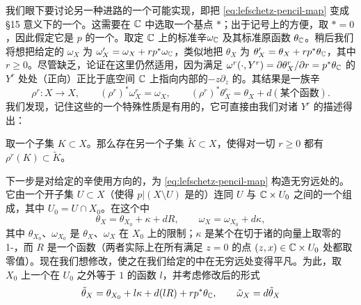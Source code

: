 我们眼下要讨论另一种进路的一个可能实现，即把 \eqref{eq:lefschetz-pencil-map} 变成 §15 意义下的一个\trExact\trLefschetzFibration。这需要在 $\mathbb{C}$ 中选取一个基点 $*$；出于记号上的方便，取 $*=0$，因此假定它是 $p$ 的一个\trRegularValue。取定 $\mathbb{C}$ 上的标准辛\trForm{}$\omega_{\mathbb{C}}$ 及其标准原函数 $\theta_{\mathbb{C}}$。稍后我们将想把给定的 $\omega_X$ \trDeformation{}为 $\omega'_X=\omega_X+rp^*\omega_{\mathbb{C}}$，类似地把 $\theta_X$ \trDeformation{}为 $\theta'_X=\theta_X+rp^*\theta_{\mathbb{C}}$，其中 $r\ge 0$。尽管缺乏\trCompactness，\trMoser{}论证在这里仍然适用，因为满足 $\omega^r(\cdot,Y^r)=\partial\theta^r_X/\partial r=p^*\theta_{\mathbb{C}}$ 的\trVectorField{}$Y^r$ 处处（正向）正比于底空间 $\mathbb{C}$ 上指向内部的\trRadial{}\trVectorField{}$-z\partial_z$ 的\trHorizontal{}\trLift。其结果是一族\trExact{}辛\trEmbedding
\begin{equation*}
\rho^r\colon X\longrightarrow X,\qquad (\rho^r)^*\omega^r_X=\omega_X,\qquad (\rho^r)^*\theta^r_X=\theta_X+d(\text{某个函数}).
\end{equation*}
我们发现，记住这些\trEmbedding{}的一个特殊性质是有用的，它可直接由我们对诸 $Y^r$ 的描述得出：
\begin{lemma}\label{thm:embedding-uniform-boundedness}
取一个\trCompact{}子集 $K\subset X$。那么存在另一个\trCompact{}子集 $\tilde{K}\subset X$，使得对一切 $r\ge 0$ 都有 $\rho^r(K)\subset\tilde{K}$。
\end{lemma}
\noqed
下一步是对给定的辛\trConnection{}使用\trRadial{}方向的\trParallelTransport，为 \eqref{eq:lefschetz-pencil-map} 构造无穷远处的\trTrivialization。它由一个开子集 $U\subset X$（使得 $p|(X\setminus U)$ 是\trProper{}的）连同 $U$ 与 $\mathbb{C}\times U_0$ 之间的一个\trFibrewise{}\trDiffeomorphism{}组成，其中 $U_0=U\cap X_0$。在这个\trTrivialization{}中
\begin{equation*}
\theta_X=\theta_{X_0}+\kappa+dR,\qquad \omega_X=\omega_{X_0}+d\kappa,
\end{equation*}
其中 $\theta_{X_0}$、$\omega_{X_0}$ 是 $\theta_X$、$\omega_X$ 在 $X_0$ 上的限制；$\kappa$ 是某个在切于诸\trFiber{}的向量上取零的 1-\trForm，而 $R$ 是一个函数（两者实际上在所有满足 $z=0$ 的点 $(z,x)\in\mathbb{C}\times U_0$ 处都取零值）。现在我们想修改\trParallelTransport，使之在我们给定的\trTrivialization{}中在无穷远处变得平凡。为此，取 $X_0$ 上一个在 $U_0$ 之外等于 $1$ 的\trCompactlySupported{}函数 $l$，并考虑修改后的形式
\begin{equation}\label{eq:modified-forms-infinity}
\tilde{\theta}_X=\theta_{X_0}+l\kappa+d(lR)+rp^*\theta_{\mathbb{C}},\qquad \tilde{\omega}_X=d\tilde{\theta}_X
\end{equation}
